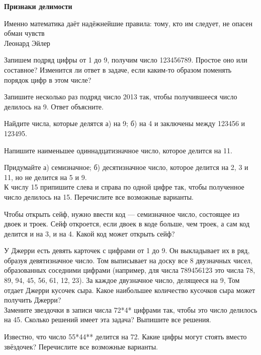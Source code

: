 \centerline{\bf \Huge Признаки делимости}

\begin{flushright}
        \scriptsize{Именно математика даёт надёжнейшие правила: тому, кто им следует, не опасен обман чувств\\ Леонард Эйлер}
\end{flushright}

 Запишем подряд цифры от 1 до 9, получим число 123456789. Простое оно или составное? Изменится ли ответ в задаче, если каким-то образом поменять порядок цифр в этом числе?

 Запишите несколько раз подряд число 2013 так, чтобы получившееся число делилось на 9. Ответ объясните.

 Найдите числа, которые делятся а) на 9; б) на 4 и заключены между 123456 и 123495.

 Напишите наименьшее одиннадцатизначное число, которое делится на 11.

 Придумайте а) семизначное; б) десятизначное число, которое делится на 2, 3 и 11, но не
делится на 5 и 9.\\

 К числу 15 припишите слева и справа по одной цифре так, чтобы полученное число делилось на 15. Перечислите все возможные варианты.

 Чтобы открыть сейф, нужно ввести код — семизначное число, состоящее из двоек и троек.
Сейф откроется, если двоек в коде больше, чем троек, а сам код делится и на 3, и на 4. Какой
код может открыть сейф?

 У Джерри есть девять карточек с цифрами от 1 до 9. Он выкладывает их в ряд, образуя девятизначное число. Том выписывает на доску все 8 двузначных
чисел, образованных соседними цифрами (например, для числа 789456123 это числа 78, 89, 94,
45, 56, 61, 12, 23). За каждое двузначное число, делящееся на 9, Том отдает Джерри кусочек
сыра. Какое наибольшее количество кусочков сыра может получить Джерри?\\

 Замените звездочки в записи числа 72*4* цифрами так, чтобы это число делилось на 45.
Сколько решений имеет эта задача? Выпишите все решения.

 Известно, что число 55*44** делится на 72. Какие цифры могут стоять вместо звёздочек? Перечислите все возможные варианты.

